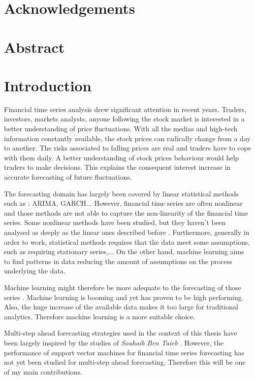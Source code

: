 \documentclass[11pt,a4paper,oneside]{book}
\begin{document}
\chapter*{Acknowledgements}


\tableofcontents


\chapter*{Abstract}


\chapter{Introduction}


Financial time series analysis drew significant attention in recent years. Traders, investors, markets analysts, anyone following the stock market is interested in a better understanding of price fluctuations. With all the medias and high-tech information constantly available, the stock prices can radically change from a day to another. The risks associated to falling prices are real and traders have to cope with them daily. A better understanding of stock prices behaviour would help traders to make decisions. This explains the consequent interest increase in accurate forecasting of future fluctuations.

The forecasting domain has largely been covered by linear statistical methods such as : ARIMA, GARCH... \cite{Holan} However, financial time series are often nonlinear and those methods are not able to capture the non-linearity of the financial time series. Some nonlinear methods have been studied, but they haven't been analysed as deeply as the linear ones described before \cite{BenTaieb}. Furthermore, generally in order to work, statistical methods requires that the data meet some assumptions, such as requiring stationary series,... On the other hand, machine learning aims to find patterns in data reducing the amount of assumptions on the process underlying the data.

Machine learning might therefore be more adequate to the forecasting of those series \cite{citeulike:13778368}. Machine learning is booming and yet has proven to be high performing. Also, the huge increase of the available data makes it too large for traditional analytics. Therefore machine learning is a more suitable choice.

Multi-step ahead forecasting strategies used in the context of this thesis have been largely inspired by the studies of \textit{Souhaib Ben Taieb} \cite{BenTaieb}. However, the performance of support vector machines for financial time series forecasting has not yet been studied for multi-step ahead forecasting. Therefore this will be one of my main contributions.
\end{document}
